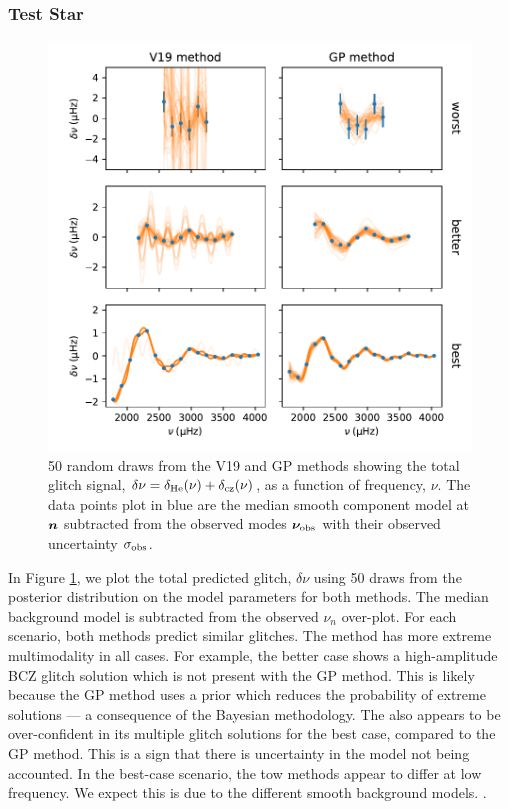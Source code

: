 \subsubsection{Test Star}

\begin{figure}
    \centering
    \includegraphics{figures/glitch-test-signal.pdf}
    \caption{50 random draws from the V19 and GP methods showing the total glitch signal, \(\delta\nu = \delta_{{\mathrm{He}}}(\nu) + \delta_{{\mathrm{cz}}}(\nu)\), as a function of frequency, \(\nu\). The data points plot in blue are the median smooth component model at \(\bm{n}\) subtracted from the observed modes \(\bm{\nu}_{{\mathrm{obs}}}\) with their observed uncertainty \(\sigma_{{\mathrm{obs}}}\).}
    \label{fig:glitch-test-signal}
\end{figure}

In Figure \ref{fig:glitch-test-signal}, we plot the total predicted glitch, \(\delta\nu\) using 50 draws from the posterior distribution on the model parameters for both methods. The median background model is subtracted from the observed \(\nu_n\) over-plot. For each scenario, both methods predict similar glitches. The  method has more extreme multimodality in all cases. For example, the better case shows a high-amplitude BCZ glitch solution which is not present with the GP method. This is likely because the GP method uses a prior which reduces the probability of extreme solutions --- a consequence of the Bayesian methodology. The  also appears to be over-confident in its multiple glitch solutions for the best case, compared to the GP method. This is a sign that there is uncertainty in the  model not being accounted. In the best-case scenario, the tow methods appear to differ at low frequency. We expect this is due to the different smooth background models. .

